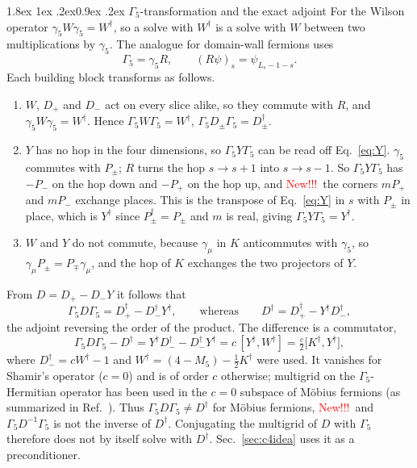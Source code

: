 \documentclass[11pt,a4paper]{article}
\makeatletter
\newif\ifshownew \shownewtrue
\DeclareRobustCommand\New{\ifshownew\textcolor{red}{New!!!}\ \else\ignorespaces\fi}
\renewcommand\subsubsection{\@startsection{subsubsection}{3}{\z@}%
  {1.8ex \@plus 1ex \@minus .2ex}{0.9ex \@plus .2ex}%
  {\centering\normalfont\small\bfseries\itshape}}
\numberwithin{equation}{section}
\newcommand{\dg}{^{\dagger}}
\newcommand{\Pp}{P_{+}}
\newcommand{\Pm}{P_{-}}
\newcommand{\Gfive}{\Gamma_5}
\makeatother
\begin{document}
\subsubsection{\texorpdfstring{$\Gfive$}{Gamma5}-transformation and the exact adjoint}
\label{sec:g5}
For the Wilson operator $\gamma_5W\gamma_5=W\dg$, so a solve with $W\dg$ is a solve with $W$
between two multiplications by $\gamma_5$. The analogue for domain-wall fermions uses
\begin{equation}
\Gfive=\gamma_5R,\qquad (R\psi)_s=\psi_{L_s-1-s} .
\end{equation}
Each building block transforms as follows.
\begin{enumerate}
\item $W$, $D_+$ and $D_-$ act on every slice alike, so they commute with $R$, and
$\gamma_5W\gamma_5=W\dg$. Hence $\Gfive W\Gfive=W\dg$, $\Gfive D_\pm\Gfive=D_\pm\dg$.
\item $Y$ has no hop in the four dimensions, so $\Gfive Y\Gfive$ can be read off
Eq.~\eqref{eq:Y}. $\gamma_5$ commutes with $P_\pm$; $R$ turns the hop $s\to s+1$ into
$s\to s-1$. So $\Gfive Y\Gfive$ has $-\Pm$ on the hop down and $-\Pp$ on the hop up,
and \New the corners $m\Pp$ and $m\Pm$ exchange places. This is the transpose of
Eq.~\eqref{eq:Y} in $s$ with $P_\pm$ in place, which is $Y\dg$ since $P_\pm\dg=P_\pm$ and $m$
is real, giving $\Gfive Y\Gfive=Y\dg$.
\item $W$ and $Y$ do not commute, because $\gamma_\mu$ in $K$ anticommutes with $\gamma_5$, so
$\gamma_\mu P_\pm=P_\mp\gamma_\mu$, and the hop of $K$ exchanges the two projectors of $Y$.
\end{enumerate}
From $D=D_+-D_-Y$ it follows that
\begin{equation}
\Gfive D\Gfive=D_+\dg-D_-\dg Y\dg ,\qquad\text{whereas}\qquad D\dg=D_+\dg-Y\dg D_-\dg ,
\label{eq:g5D}
\end{equation}
the adjoint reversing the order of the product. The difference is a commutator,
\begin{equation}
\Gfive D\Gfive-D\dg=Y\dg D_-\dg-D_-\dg Y\dg=c\,[Y\dg,W\dg]=\tfrac{c}{2}\big[K\dg,Y\dg\big],
\label{eq:g5herm}
\end{equation}
where $D_-\dg=cW\dg-1$ and $W\dg=(4-M_5)-\frac12K\dg$ were used. It vanishes for Shamir's
operator ($c=0$) and is of order $c$ otherwise; multigrid on the $\Gfive$-Hermitian operator has been used
in the $c=0$ subspace of M\"obius fermions (as summarized in Ref.~\cite{BoyleMRHS}). Thus $\Gfive D\Gfive\neq D\dg$ for M\"obius
fermions, \New and $\Gfive D^{-1}\Gfive$ is not the inverse of $D\dg$. Conjugating the multigrid of
$D$ with $\Gfive$ therefore does not by itself solve with $D\dg$. Sec.~\ref{sec:c4idea} uses it as a
preconditioner.
\end{document}
